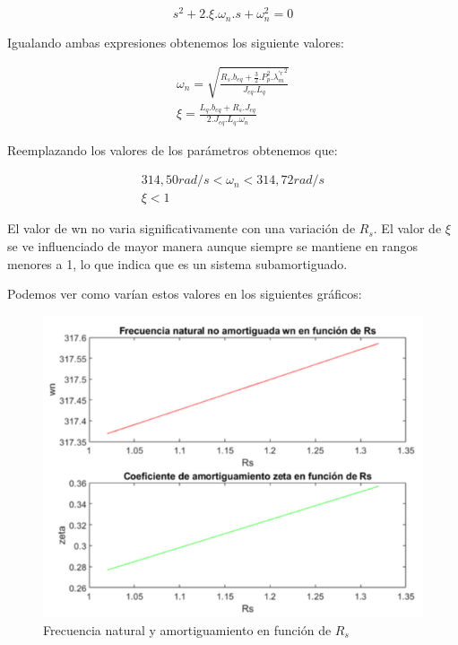 \documentclass{article}
\begin{document}
\begin{equation}
    s^2 + 2.\xi.\omega_n.s + \omega_n^2 = 0
\end{equation}

Igualando ambas expresiones obtenemos los siguiente valores:

\begin{align*}
    \omega_n = \sqrt{\frac{R_s.b_{eq} + \frac{3}{2}.P_p^2.{\lambda_m^{\prime r}}^2}{J_{eq}.L_q}} \\
    \xi = \frac{L_q.b_{eq} + R_s.J_{eq}}{2.J_{eq}.L_q.\omega_n}
\end{align*}

Reemplazando los valores de los parámetros obtenemos que:

\begin{align*}
    314,50 rad/s < \omega_n < 314,72rad/s \\
    \xi < 1
\end{align*}

El valor de wn no varia significativamente con una variación de $R_s$. El valor de $\xi$
se ve influenciado de mayor manera aunque siempre se mantiene en rangos menores a 1, lo que 
indica que es un sistema subamortiguado.

Podemos ver como varían estos valores en los siguientes gráficos:

\begin{figure}[H]
    \centering
    \includegraphics{frecuancia_amortiguamiento_rs.png}
    \caption{Frecuencia natural y amortiguamiento en función de $R_s$}
\end{figure}
\end{document}
